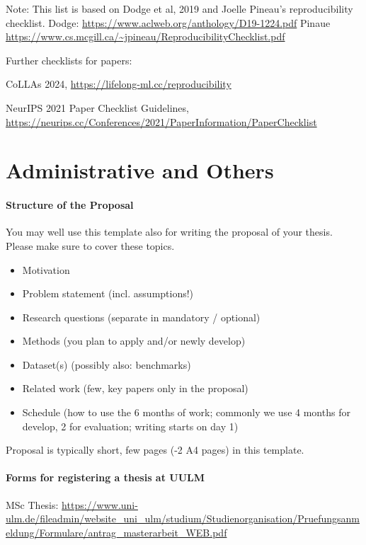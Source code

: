 \documentclass[manuscript, nonacm]{acmart}
\begin{document}
Note:
This list is based on Dodge et al, 2019 and Joelle Pineau's reproducibility checklist.
Dodge: \url{https://www.aclweb.org/anthology/D19-1224.pdf}
Pinaue \url{https://www.cs.mcgill.ca/~jpineau/ReproducibilityChecklist.pdf}

Further checklists for papers:

CoLLAs 2024, \url{https://lifelong-ml.cc/reproducibility}

NeurIPS 2021 Paper Checklist Guidelines, \url{https://neurips.cc/Conferences/2021/PaperInformation/PaperChecklist}


\section{Administrative and Others}

\paragraph{Structure of the Proposal}

You may well use this template also for writing the proposal of your thesis.
Please make sure to cover these topics.

\begin{itemize}
    \item Motivation
    \item Problem statement (incl. assumptions!)
    \item Research questions (separate in mandatory / optional)
    \item Methods (you plan to apply and/or newly develop)
    \item Dataset(s) (possibly also: benchmarks)
    \item Related work (few, key papers only in the proposal)
    \item Schedule (how to use the 6 months of work; commonly we use 4 months for develop, 2 for evaluation; writing starts on day 1)
\end{itemize}

Proposal is typically short, few pages (-2 A4 pages) in this template.

\paragraph{Forms for registering a thesis at UULM}

MSc Thesis:
\url{https://www.uni-ulm.de/fileadmin/website_uni_ulm/studium/Studienorganisation/Pruefungsanmeldung/Formulare/antrag_masterarbeit_WEB.pdf}
\end{document}
